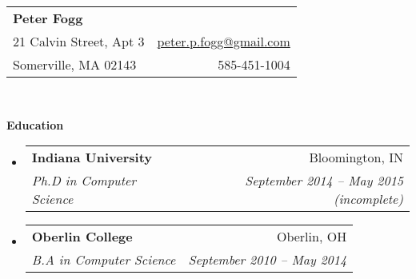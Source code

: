 \documentclass[letterpaper,11pt]{article}
\makeatletter
\newcommand{\resitem}[1]{\item #1 \vspace{-2pt}}
\newcommand{\resheading}[1]{{\large\colorbox{mygrey}{\begin{minipage}{\textwidth}{\textbf{#1\vphantom{p\^{E}}}}\end{minipage}}}}
\newcommand{\ressubheading}[4]{
  \begin{tabular*}{6.5in}{l@{\extracolsep{\fill}}r}
    \textbf{#1} & #2 \\
    \textit{#3} & \textit{#4} \\
  \end{tabular*}\vspace{-6pt}}
\makeatother
\begin{document}
\newcommand{\mywebheader}{
  \begin{tabular*}{7in}{l@{\extracolsep{\fill}}r}
    \textbf{\LARGE Peter Fogg} & \\
    21 Calvin Street, Apt 3 & \href{mailto:peter.p.fogg@gmail.com}{peter.p.fogg@gmail.com} \\
    Somerville, MA 02143 & 585-451-1004 \\
  \end{tabular*}
  \\
  \vspace{0.1in}}

\mywebheader

\resheading{Education}
\begin{itemize}
\item
  \ressubheading{Indiana University}{Bloomington, IN}{Ph.D in Computer Science}{September 2014 -- May 2015 (incomplete)}
\item
  \ressubheading{Oberlin College}{Oberlin, OH}{B.A in Computer Science}{September 2010 -- May 2014}
\end{itemize}
\end{document}
